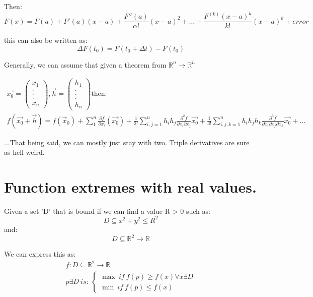 \documentclass[11pt,fleqn]{book} %
\begin{document}
Then:
\begin{equation}
    F(x) = F(a) + F'(a) (x-a) + \frac{F''(a)}{\alpha !} (x-a)^2 + \dots + \frac{F^{(k)}(x-a)^k}{k!} (x-a)^k + error    
\end{equation}

this can also be written as:
\begin{equation}
    \Delta F(t_0) = F(t_0+\Delta t) - F(t_0)
\end{equation}

Generally, we can assume that given a theorem from $\mathbb{R}^n \to \mathbb{R}^n$

\begin{gather}
    \vec{x_0} = \begin{pmatrix}
        x_1 \\
        . \\
        . \\
        . \\
        x_n
    \end{pmatrix} ,
    \vec{h} = \begin{pmatrix}
        h_1 \\
        . \\
        . \\
        . \\
        h_n
    \end{pmatrix} \text{then:} \\
    f(\vec{x_0}+ \vec{h}) = f(\vec{x}_0) + \sum_{1}^{n} \frac{\partial f}{\partial x_i}(\vec{x_0}) + \frac{1}{2!} \sum_{i,j = 1}^{n} h_i h_j \frac{\partial^2 f}{\partial x_i \partial x_j} \vec{x_0} +  
    \frac{1}{3!} \sum_{i,j,k = 1}^{n} h_i h_j h_k \frac{\partial^3 f}{\partial x_i \partial x_j \partial x_k} \vec{x_0} + \dots 
\end{gather}

...That being said, we can mostly just stay with two. Triple derivatives are sure as hell weird. 

\section{Function extremes with real values.}

Given a set 'D' that is bound if we can find a value R > 0 such as:
$$ D \subseteq x^2 + y^2 \leq R^2 $$
and:
$$ D \subseteq \mathbb{R}^2 \to \mathbb{R} $$

We can express this as:
\begin{gather}
    f: D \subseteq \mathbb{R}^2 \to \mathbb{R} \\
    p \exists D \ is: \ \begin{cases}
        \max \ if \ f(p) \geq f(x) \forall x \exists D \\
        \min \ if \ f(p) \leq f(x) 
    \end{cases}
\end{gather}
\end{document}
